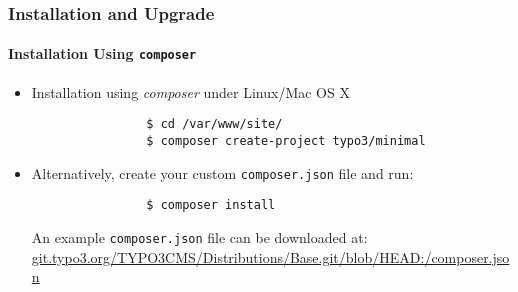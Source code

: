 \begin{frame}[fragile]
	\frametitle{Installation and Upgrade}
	\framesubtitle{Installation Using \texttt{composer}}

	\begin{itemize}
		\item Installation using \textit{composer} under Linux/Mac OS X

			\begin{lstlisting}
				$ cd /var/www/site/
				$ composer create-project typo3/minimal
			\end{lstlisting}

		\item Alternatively, create your custom \texttt{composer.json} file and run:

			\begin{lstlisting}
				$ composer install
			\end{lstlisting}

			An example \texttt{composer.json} file can be downloaded at:\newline
			\small
				\href{https://git.typo3.org/TYPO3CMS/Distributions/Base.git/blob/HEAD:/composer.json}{git.typo3.org/TYPO3CMS/Distributions/Base.git/blob/HEAD:/composer.json}
			\normalsize

	\end{itemize}
\end{frame}

